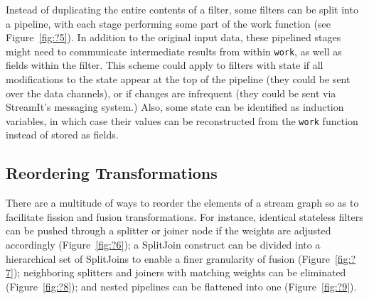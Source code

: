 Instead of duplicating the entire contents of a filter, some filters
can be split into a pipeline, with each stage performing some part of
the work function (see Figure~\ref{fig:?5}).  In addition to the
original input data, these pipelined stages might need to communicate
intermediate results from within {\tt work}, as well as fields within
the filter.  This scheme could apply to filters with state if all
modifications to the state appear at the top of the pipeline (they
could be sent over the data channels), or if changes are infrequent
(they could be sent via StreamIt's messaging system.)  Also, some
state can be identified as induction variables, in which case their
values can be reconstructed from the {\tt work} function instead of
stored as fields.

\subsection{Reordering Transformations}

There are a multitude of ways to reorder the elements of a stream
graph so as to facilitate fission and fusion transformations.  For
instance, identical stateless filters can be pushed through a splitter
or joiner node if the weights are adjusted accordingly
(Figure~\ref{fig:?6}); a SplitJoin construct can be divided into a
hierarchical set of SplitJoins to enable a finer granularity of fusion
(Figure~\ref{fig:?7}); neighboring splitters and joiners with matching
weights can be eliminated (Figure~\ref{fig:?8}); and nested pipelines
can be flattened into one (Figure~\ref{fig:?9}).

